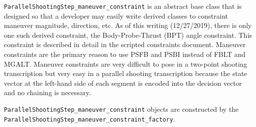 \texttt{ParallelShootingStep\_maneuver\_constraint} is an abstract base class that is designed so that a developer may easily write derived classes to constraint maneuver magnitude, direction, etc. As of this writing (12/27/2019), there is only one such derived constraint, the Body-Probe-Thrust (BPT) angle constraint. This constraint is described in detail in the scripted constraints document. Maneuver constraints are the primary reason to use \ac{PSFB} and \ac{PSBI} instead of \ac{FBLT} and \ac{MGALT}. Maneuver constraints are very difficult to pose in a two-point shooting transcription but very easy in a parallel shooting transcription because the state vector at the left-hand side of each segment is encoded into the decision vector and no chaining is necessary.

\texttt{ParallelShootingStep\_maneuver\_constraint} objects are constructed by the \texttt{ParallelShootingStep\_maneuver\_constraint\_factory}.
	
\endinput
